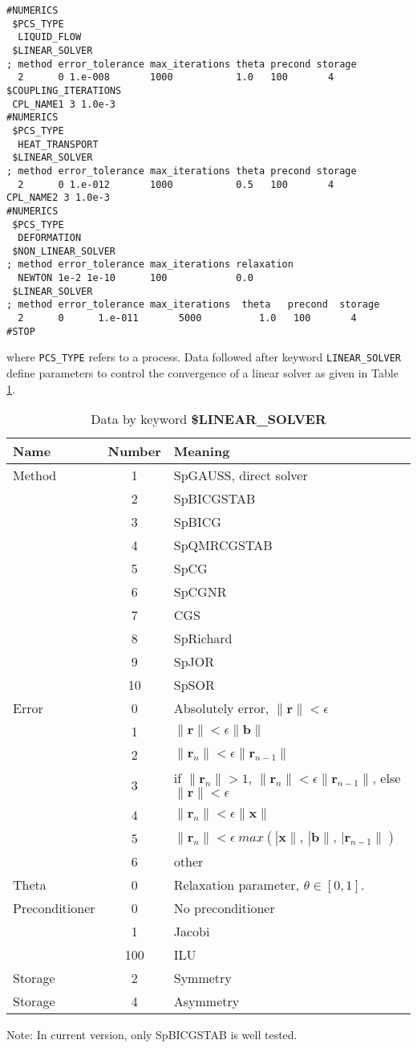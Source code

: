 \begin{verbatim}
#NUMERICS
 $PCS_TYPE
  LIQUID_FLOW
 $LINEAR_SOLVER
; method error_tolerance max_iterations theta precond storage
  2      0 1.e-008       1000           1.0   100       4
$COUPLING_ITERATIONS
 CPL_NAME1 3 1.0e-3
#NUMERICS
 $PCS_TYPE
  HEAT_TRANSPORT
 $LINEAR_SOLVER
; method error_tolerance max_iterations theta precond storage
  2      0 1.e-012       1000           0.5   100       4
CPL_NAME2 3 1.0e-3
#NUMERICS
 $PCS_TYPE
  DEFORMATION
 $NON_LINEAR_SOLVER
; method error_tolerance max_iterations relaxation
  NEWTON 1e-2 1e-10      100            0.0
 $LINEAR_SOLVER
; method error_tolerance max_iterations  theta   precond  storage
  2      0      1.e-011       5000          1.0   100       4
#STOP
\end{verbatim}
where \texttt{PCS\_TYPE} refers to a process. Data followed after keyword \texttt{LINEAR\_SOLVER} define
   parameters to control the convergence of a linear solver as given in Table \ref{tab_num1}.
{\ttfamily
  \small
\begin{table}[!htb]
\centering
\begin{tabular}{|l|c|l|}
  \hline
  Name &Number & Meaning  \\
  \hline
  \hline %
  Method &  1  &SpGAUSS, direct solver\\
  &  2  &SpBICGSTAB\\
  &  3  &SpBICG\\
 &  4  &SpQMRCGSTAB\\
  &  5  &SpCG\\
  &  6  &SpCGNR\\
  &  7  &CGS\\
  &  8  &SpRichard\\
  &  9  &SpJOR\\
  &  10  &SpSOR\\
 \hline
  Error &  0  &Absolutely error, $\|\bm r\|<\epsilon$\\
 &  1  &$\|\bm r\|<\epsilon\|\bm b\|$\\
 &  2  &$\|\bm r_n\|<\epsilon\|\bm r_{n-1}\|$\\
 &  3  &if  $\|\bm r_{n}\|>1$, $\|\bm r_n\|<\epsilon\|\bm r_{n-1}\|$, else $\|\bm r\|<\epsilon$\\
 &  4  &$\|\bm r_n\|<\epsilon\|\bm x\|$\\
 &  5  &$\|\bm r_n\|<\epsilon\ max(|\bm x\|,\,|\bm b\|, \,|\bm r_{n-1}\|)$\\
 &  6  &other\\
\hline
  Theta &  0  &Relaxation parameter, $\theta\in[0,1]$.  \\
 \hline
  Preconditioner &  0  &No preconditioner  \\
   &  1  &Jacobi  \\
  &  100  &ILU  \\
 \hline
  Storage &  2  &Symmetry  \\
 Storage &  4  &Asymmetry  \\
 \hline
 \hline
\end{tabular}
\caption{Data by keyword \textbf{\$LINEAR\_SOLVER}}
\label{tab_num1}
\end{table}
}
Note: In current version, only SpBICGSTAB is well tested.

